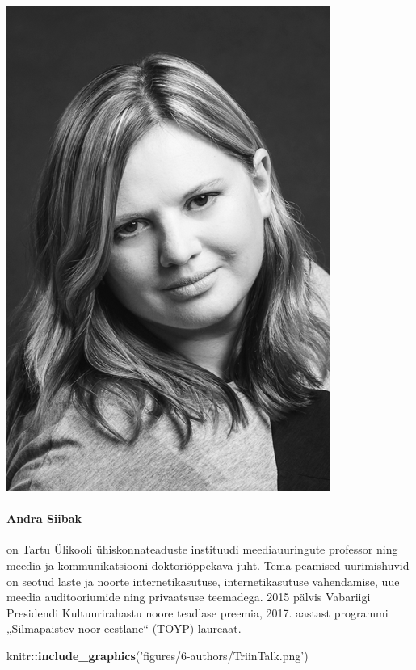 \documentclass[estonian,]{article}
\newenvironment{Shaded}{\begin{snugshade}}{\end{snugshade}}
\newcommand{\KeywordTok}[1]{\textcolor[rgb]{0.13,0.29,0.53}{\textbf{#1}}}
\newcommand{\NormalTok}[1]{#1}
\newcommand{\OperatorTok}[1]{\textcolor[rgb]{0.81,0.36,0.00}{\textbf{#1}}}
\newcommand{\StringTok}[1]{\textcolor[rgb]{0.31,0.60,0.02}{#1}}
\let\oldparagraph\paragraph
\renewcommand{\paragraph}[1]{\oldparagraph{#1}\mbox{}}
\begin{document}
\begin{flushleft}\includegraphics[width=0.5\linewidth]{figures/6-authors/AndraSiibak} \end{flushleft}

\hypertarget{andra-siibak}{%
\paragraph{Andra Siibak}\label{andra-siibak}}

on Tartu Ülikooli ühiskonnateaduste instituudi meediauuringute professor ning meedia ja kommunikatsiooni doktoriõppekava juht. Tema peamised uurimishuvid on seotud laste ja noorte internetikasutuse, internetikasutuse vahendamise, uue meedia auditooriumide ning privaatsuse teemadega. 2015 pälvis Vabariigi Presidendi Kultuurirahastu noore teadlase preemia, 2017. aastast programmi „Silmapaistev noor eestlane`` (TOYP) laureaat.

\begin{Shaded}
\begin{Highlighting}[]
\NormalTok{knitr}\OperatorTok{::}\KeywordTok{include_graphics}\NormalTok{(}\StringTok{'figures/6-authors/TriinTalk.png'}\NormalTok{)}
\end{Highlighting}
\end{Shaded}
\end{document}
